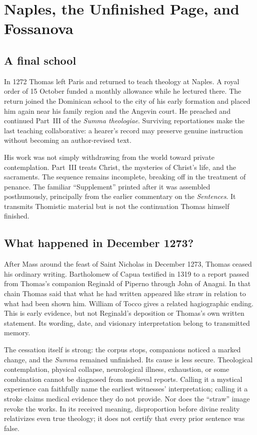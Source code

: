 \section{Naples, the Unfinished Page, and Fossanova}

\subsection{A final school}

In 1272 Thomas left Paris and returned to teach theology at Naples.  A royal
order of 15 October funded a monthly allowance while he lectured there.  The
return joined the Dominican school to the city of his early formation and
placed him again near his family region and the Angevin court.  He preached and
continued Part~III of the \emph{Summa theologiae}.  Surviving reportationes make the last
teaching collaborative: a hearer's record may preserve genuine instruction
without becoming an author-revised text.

His work was not simply withdrawing from the world toward private
contemplation.  Part~III treats Christ, the mysteries of Christ's life, and the
sacraments.  The sequence remains incomplete, breaking off in the treatment of
penance.  The familiar ``Supplement'' printed after it was assembled
posthumously, principally from the earlier commentary on the \emph{Sentences}.
It transmits Thomistic material but is not the continuation Thomas himself
finished.

\subsection{What happened in December 1273?}

After Mass around the feast of Saint Nicholas in December 1273, Thomas ceased
his ordinary writing.  Bartholomew of Capua testified in 1319 to a report passed
from Thomas's companion Reginald of Piperno through John of Anagni.  In that
chain Thomas said that what he had written appeared like straw in relation to
what had been shown him.  William of Tocco gives a related hagiographic ending.
This is early evidence, but not Reginald's deposition or Thomas's own written
statement.  Its wording, date, and visionary interpretation belong to
transmitted memory.

The cessation itself is strong: the corpus stops, companions noticed a marked
change, and the \emph{Summa} remained unfinished.  Its cause is less secure.
Theological contemplation, physical collapse, neurological illness,
exhaustion, or some combination cannot be diagnosed from medieval reports.
Calling it a mystical experience can faithfully name the earliest witnesses'
interpretation; calling it a stroke claims medical evidence they do not
provide.  Nor does the ``straw'' image revoke the works.  In its received
meaning, disproportion before divine reality relativizes even true theology;
it does not certify that every prior sentence was false.


